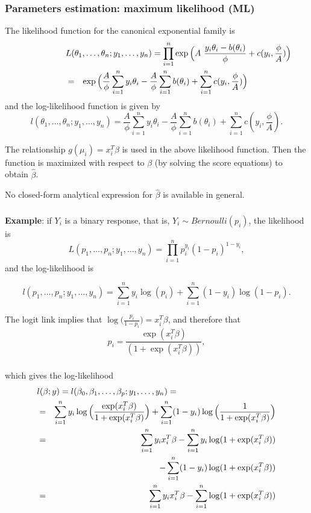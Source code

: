 \documentclass{beamer}
\newcommand{\bs}{\bigskip}
\begin{document}
\begin{frame}[allowframebreaks]
\frametitle{Parameters estimation: maximum likelihood (ML)}
The likelihood function for the {\color{blue}canonical exponential 
family} is
\begin{eqnarray*}
  \label{lik.exp}
  \lefteqn{L(\theta_1,\ldots, \theta_n; y_1, \ldots, y_n)= \prod_{i=1}^n \exp \Big( A \ \frac{y_i \theta_i - b(\theta_i)}{\phi} +
c(y_i,\frac{\phi}{A})\Big) }\\
& = & \exp \Big( \frac{A}{\phi} \sum_{i=1}^n y_i \theta_i - \frac{A}{\phi}
\sum_{i=1}^n b(\theta_i) + \sum_{i=1}^n c(y_i,\frac{\phi}{A}) \Big)
\end{eqnarray*}
and the log-likelihood function is given by
$$l(\theta_1,\ldots, \theta_n; y_1, \ldots, y_n)
 =  \frac{A}{\phi} \sum_{i=1}^n y_i \theta_i - \frac{A}{\phi}
\sum_{i=1}^n b(\theta_i) + \sum_{i=1}^n c(y_i,\frac{\phi}{A}).$$

The relationship  $g(\mu_i) = x_i^T \beta$ is used in the above
likelihood function. Then the function is maximized with respect to
$\beta$ (by solving the score equations) to obtain $\hat{\beta}$.

\bs

No closed-form analytical expression for $\hat{\beta}$ is available in general.
\end{frame}

\begin{frame}
\frametitle{}

\textbf{Example}: if $Y_i$ is a binary response, that is, $Y_i \sim
Bernoulli(p_i)$, the likelihood is
\begin{equation*}
  \label{lik.bernoulli}
  L(p_1,\ldots, p_n; y_1, \ldots, y_n) = \prod_{i=1}^n p_i^{y_i} (1-p_i)^{1-y_i},
\end{equation*}
and the log-likelihood is

\begin{equation}
  \label{loglik.bernoulli}
l(p_1,\ldots, p_n; y_1, \ldots, y_n) = \sum_{i=1}^n y_i \log (p_i) + \sum_{i=1}^n (1-y_i) \log(1-p_i). 
\end{equation}

\bs
The logit link implies that $\log \big(\frac{p_i}{1-p_i}\big) = x_i^T
\beta$, and therefore that
$$p_i = \frac{\exp(x_i^T \beta)}{(1+\exp(x_i^T \beta))},$$
\end{frame}

\begin{frame}
\frametitle{}
which gives the log-likelihood
\begin{eqnarray*}
 \lefteqn{l(\beta;y)=l(\beta_0, \beta_1,\ldots,\beta_p; y_1, \ldots, y_n)=}\\
& = &  \sum_{i=1}^n y_i \log \Big(\frac{\exp(x_i^T \beta)}{1+\exp(x_i^T
  \beta)} \Big) +  \sum_{i=1}^n (1-y_i) \log\Big(\frac{1}{1+\exp(x_i^T \beta)} \Big) \\
& = &  \sum_{i=1}^n y_i x_i^T \beta -  \sum_{i=1}^n y_i \log( 1 +
\exp(x_i^T \beta)) \\
& & - \sum_{i=1}^n (1-y_i) \log(1+\exp(x_i^T \beta))\\
& = & \sum_{i=1}^n y_i x_i^T \beta - \sum_{i=1}^n \log(1+\exp(x_i^T \beta))
\end{eqnarray*}
\end{frame}
\end{document}
